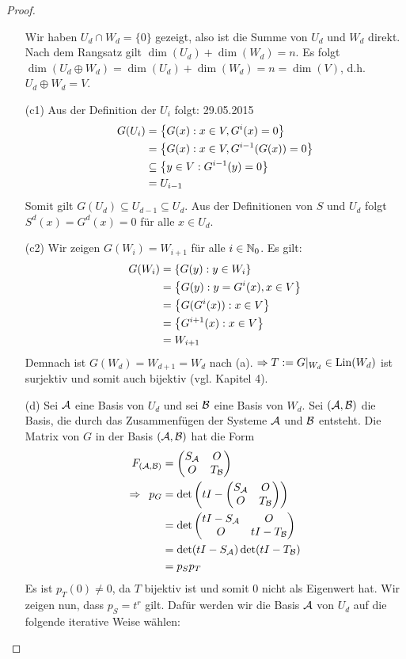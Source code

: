 \begin{proof}
\begin{itemize}
			Wir haben $ U_d \cap W_d = \{0\} $ gezeigt, also ist die Summe von $ U_d $ und $ W_d $ direkt. Nach dem Rangsatz gilt $ \dim(U_d) + \dim(W_d) = n $. Es folgt $ \dim(U_d \oplus W_d) = \dim(U_d) + \dim(W_d) = n = \dim(V) $, d.h. $ U_d \oplus W_d = V $.
		\item[(c1)]
			Aus der Definition der $ U_i $ folgt: \hfill 29.05.2015
			\begin{align}
				G(U_i) &= \left\{ G(x) : x \in V, G^i(x)=0 \right\} \nonumber \\
				&= \left\{ G(x) : x \in V, G^{i-1}(G(x)) = 0 \right\} \nonumber \\
				&\subseteq \left\{ y \in V : G^{i-1}(y) = 0 \right\} \nonumber \\
				&= U_{i-1}
				\label{eq:6_4_4:ast}
			\end{align}
			Somit gilt $ G(U_d) \subseteq U_{d-1} \subseteq U_d $. Aus der Definitionen von $ S $ und $ U_d $ folgt $ S^d(x) = G^d(x) = 0 $ für alle $ x \in U_d $.
		\item[(c2)]
			Wir zeigen $ G(W_i) = W_{i+1} $ für alle $ i \in \mathbb N_0 $. Es gilt:
			\begin{align}
				G(W_i) &= \left\{ G(y) : y \in W_i \right\} \nonumber \\
				&= \left\{ G(y) : y = G^i(x), x \in V \right\} \nonumber \\
				&= \left\{ G(G^i(x)) : x \in V \right\} \nonumber \\
				&= \left\{ G^{i+1}(x) : x \in V \right\} \nonumber \\
				&= W_{i+1}
				\label{eq:6_4_4:astast}
			\end{align}
			Demnach ist $ G(W_d) = W_{d+1} = W_d $ nach (a). $ \Rightarrow T := G|_{W_d} \in \operatorname{Lin}(W_d) $ ist surjektiv und somit auch bijektiv (vgl. Kapitel 4).
		\item[(d)]
			Sei $ \mathcal{A} $ eine Basis von $ U_d $ und sei $ \mathcal{B} $ eine Basis von $ W_d $. Sei $ (\mathcal{A},\mathcal{B}) $ die Basis, die durch das Zusammenfügen der Systeme $ \mathcal{A} $ und $ \mathcal{B} $ entsteht. Die Matrix von $ G $ in der Basis $ (\mathcal{A},\mathcal{B}) $ hat die Form
			\begin{align*}
				F_{(\mathcal{A},\mathcal{B})} &= \begin{pmatrix}
					S_{\mathcal{A}} & O \\
					O & T_{\mathcal{B}}
				\end{pmatrix} \\
				\Rightarrow \enspace p_G &= \det\left( tI - \begin{pmatrix}
					S_{\mathcal{A}} & O \\
					O & T_{\mathcal{B}}
				\end{pmatrix} \right) \\
				&= \det\begin{pmatrix}
					tI - S_{\mathcal{A}} & O \\
					O & tI - T_{\mathcal{B}}
				\end{pmatrix} \\
				&= \det(tI - S_{\mathcal{A}}) \det(tI - T_{\mathcal{B}}) \\
				&= p_S p_T
			\end{align*}
			Es ist $ p_T(0) \neq 0 $, da $ T $ bijektiv ist und somit 0 nicht als Eigenwert hat. Wir zeigen nun, dass $ p_S = t^r $ gilt. Dafür werden wir die Basis $ \mathcal{A} $ von $ U_d $ auf die folgende iterative Weise wählen:
			

\end{itemize}
\end{proof}
